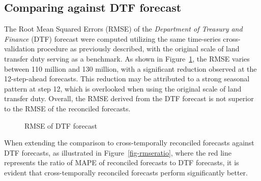 \documentclass[
  11pt,
  a4paper,
]{article}
\begin{document}
\subsection{Comparing against DTF
forecast}\label{comparing-against-dtf-forecast}

The Root Mean Squared Errors (RMSE) of the \emph{Department of Treasury
and Finance} (DTF) forecast were computed utilizing the same time-series
cross-validation procedure as previously described, with the original
scale of land transfer duty serving as a benchmark. As shown in
Figure~\ref{fig-dtfrmse}, the RMSE varies between 110 million and 130
million, with a significant reduction observed at the 12-step-ahead
forecasts. This reduction may be attributed to a strong seasonal pattern
at step 12, which is overlooked when using the original scale of land
transfer duty. Overall, the RMSE derived from the DTF forecast is not
superior to the RMSE of the reconciled forecasts.

\begin{figure}


\caption{\label{fig-dtfrmse}RMSE of DTF forecast}

\end{figure}%

When extending the comparison to cross-temporally reconciled forecasts
against DTF forecasts, as illustrated in Figure~\ref{fig-rmseratio},
where the red line represents the ratio of MAPE of reconciled forecasts
to DTF forecasts, it is evident that cross-temporally reconciled
forecasts perform significantly better.
\end{document}
